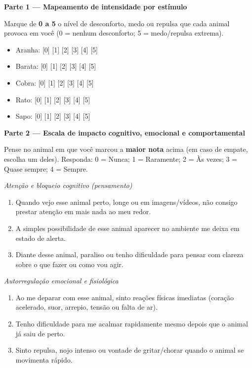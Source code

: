 \vspace{0.3cm}
\noindent\textbf{Parte 1 --- Mapeamento de intensidade por estímulo}

\noindent Marque de \textbf{0 a 5} o nível de desconforto, medo ou repulsa que
cada animal provoca em você (0 = nenhum desconforto; 5 = medo/repulsa extrema).

\begin{itemize}
  \item Aranha: [0] [1] [2] [3] [4] [5]
  \item Barata: [0] [1] [2] [3] [4] [5]
  \item Cobra: [0] [1] [2] [3] [4] [5]
  \item Rato: [0] [1] [2] [3] [4] [5]
  \item Sapo: [0] [1] [2] [3] [4] [5]
\end{itemize}

\vspace{0.3cm}
\noindent\textbf{Parte 2 --- Escala de impacto cognitivo, emocional e comportamental}

\noindent Pense no animal em que você marcou a \textbf{maior nota} acima (em
caso de empate, escolha um deles). Responda: 0 = Nunca; 1 = Raramente;
2 = Às vezes; 3 = Quase sempre; 4 = Sempre.

\vspace{0.2cm}
\noindent\emph{Atenção e bloqueio cognitivo (pensamento)}
\begin{enumerate}
  \item Quando vejo esse animal perto, longe ou em imagens/vídeos, não consigo
  prestar atenção em mais nada ao meu redor.
  \item A simples possibilidade de esse animal aparecer no ambiente me deixa em
  estado de alerta.
  \item Diante desse animal, paraliso ou tenho dificuldade para pensar com
  clareza sobre o que fazer ou como vou agir.
\end{enumerate}

\noindent\emph{Autorregulação emocional e fisiológica}
\begin{enumerate}
  \item Ao me deparar com esse animal, sinto reações físicas imediatas (coração
  acelerado, suor, arrepio, tensão ou falta de ar).
  \item Tenho dificuldade para me acalmar rapidamente mesmo depois que o animal
  já saiu de perto.
  \item Sinto repulsa, nojo intenso ou vontade de gritar/chorar quando o animal
  se movimenta rápido.
\end{enumerate}

